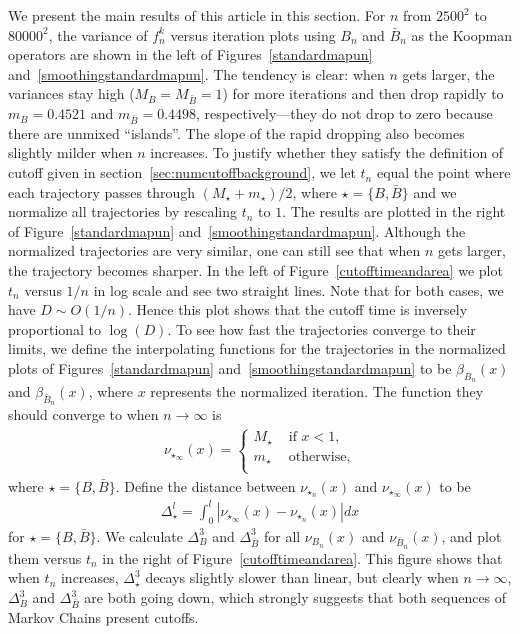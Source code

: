 We present the main results of this article in this section. For $n$ from $2500^2$ to $80000^2$, the variance of $f^k_n$ versus iteration plots using $B_n$ and $\bar{B}_n$ as
the Koopman operators are shown in the left of Figures~\ref{standardmapun} and~\ref{smoothingstandardmapun}. The tendency is clear: when $n$ gets larger, the variances stay high ($M_B=M_{\bar{B}}=1$)
for more iterations and then drop rapidly to $m_{B} = 0.4521$ and $m_{\bar{B}}=0.4498$, respectively---they do not drop to zero because there
are unmixed ``islands''. The slope of the rapid dropping also becomes slightly milder when $n$ increases. To
justify whether they satisfy the definition of cutoff given in section~\ref{sec:numcutoffbackground}, we let $t_n$ equal the
point where each trajectory passes through $(M_{\star}+m_{\star})/2$, where $\star=\{B,\bar{B}\}$ and we normalize all trajectories by rescaling
$t_n$ to $1$. The results are plotted in the right of Figure~\ref{standardmapun} and~\ref{smoothingstandardmapun}. Although the normalized trajectories are very similar, one can still
see that when $n$ gets larger, the trajectory becomes sharper. In the left of Figure~\ref{cutofftimeandarea} we plot $t_n$ versus $1/n$ in log scale and see two straight lines. Note that for both cases, we have $D\sim O(1/n)$. Hence this plot shows that the cutoff time is inversely proportional to $\log(D)$. To see how fast the trajectories converge to their limits, we define the interpolating functions for the trajectories in the normalized plots of Figures~\ref{standardmapun} and~\ref{smoothingstandardmapun} to be $\beta_{B_n}(x)$ and $\beta_{\bar{B}_n}(x)$, where $x$ represents the normalized iteration. The function they should converge to when $n\to \infty$ is
\begin{eqnarray}
   \label{limittraj}
   \nu_{\star_\infty}(x) = \begin{cases}
                     M_{\star} &\text{ if } x<1, \\
                     m_{\star} &\text{ otherwise}, \\
                     \end{cases} 
\end{eqnarray}
where $\star=\{B,\bar{B}\}$. Define the distance between $\nu_{\star_n}(x)$ and $\nu_{\star_\infty}(x)$ to be
\begin{eqnarray}
    \label{trajdistance}
    \Delta_{\star}^l= \int_0^l | \nu_{{\star}_\infty}(x)-\nu_{{\star}_n}(x)|dx
\end{eqnarray}
for $\star=\{B,\bar{B}\}$. We calculate $\Delta^3_B$ and $\Delta^3_{\bar{B}}$ for all $\nu_{B_n}(x)$ and $\nu_{\bar{B}_n}(x)$, and plot them versus $t_n$ in the right of Figure~\ref{cutofftimeandarea}. This figure shows that when $t_n$ increases, $\Delta_{\star}^3$ decays slightly slower than linear, but clearly when $n \rightarrow \infty$, $\Delta^3_{B}$ and $\Delta^3_{\bar{B}}$ are both going down, which strongly suggests that both sequences of Markov Chains present cutoffs. 

